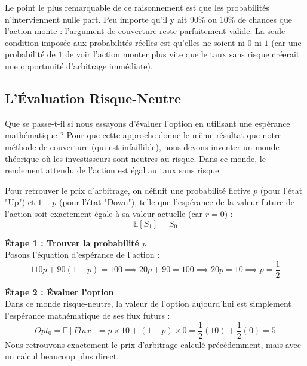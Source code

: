 \begin{remarquebox}
Le point le plus remarquable de ce raisonnement est que les probabilités n'interviennent nulle part. Peu importe qu'il y ait 90\% ou 10\% de chances que l'action monte : l'argument de couverture reste parfaitement valide. La seule condition imposée aux probabilités réelles est qu'elles ne soient ni $0$ ni $1$ (car une probabilité de $1$ de voir l'action monter plus vite que le taux sans risque créerait une opportunité d'arbitrage immédiate).
\end{remarquebox}

\newpage

\subsection{L'Évaluation Risque-Neutre}

\begin{intuitionbox}
Que se passe-t-il si nous essayons d'évaluer l'option en utilisant une espérance mathématique ? Pour que cette approche donne le même résultat que notre méthode de couverture (qui est infaillible), nous devons inventer un monde théorique où les investisseurs sont neutres au risque. Dans ce monde, le rendement attendu de l'action est égal au taux sans risque.
\end{intuitionbox}

\begin{theorembox}
Pour retrouver le prix d'arbitrage, on définit une probabilité fictive $p$ (pour l'état "Up") et $1-p$ (pour l'état "Down"), telle que l'espérance de la valeur future de l'action soit exactement égale à sa valeur actuelle (car $r=0$) :
\begin{equation*}
    \mathbb{E}[S_1] = S_0
\end{equation*}
\end{theorembox}

\begin{examplebox}
\textbf{Étape 1 : Trouver la probabilité $p$}\\
Posons l'équation d'espérance de l'action :
\begin{equation*}
    110p + 90(1-p) = 100 \implies 20p + 90 = 100 \implies 20p = 10 \implies p = \frac{1}{2}
\end{equation*}

\textbf{Étape 2 : Évaluer l'option}\\
Dans ce monde risque-neutre, la valeur de l'option aujourd'hui est simplement l'espérance mathématique de ses flux futurs :
\begin{equation*}
    Opt_0 = \mathbb{E}[Flux] = p \times 10 + (1-p) \times 0 = \frac{1}{2}(10) + \frac{1}{2}(0) = 5
\end{equation*}
Nous retrouvons exactement le prix d'arbitrage calculé précédemment, mais avec un calcul beaucoup plus direct.
\end{examplebox}

